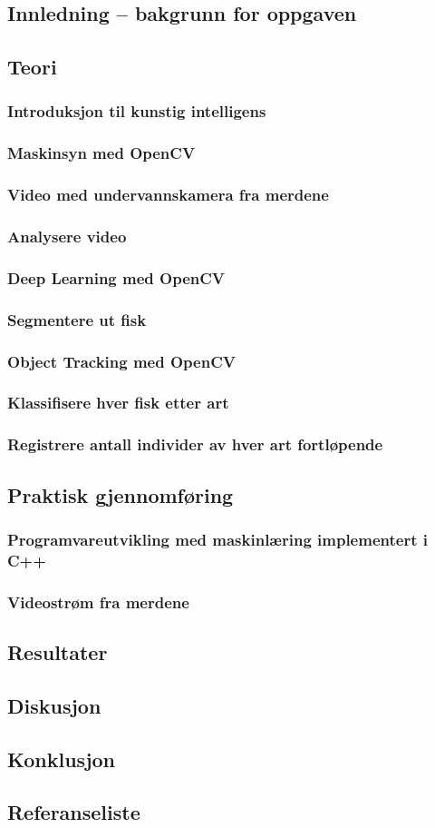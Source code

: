 \subsection{Innledning -- bakgrunn for oppgaven}
\subsection{Teori}
\subsubsection{Introduksjon til kunstig intelligens}
\subsubsection{Maskinsyn med OpenCV}
\subsubsection{Video med undervannskamera fra merdene}
\subsubsection{Analysere video}
\subsubsection{Deep Learning med OpenCV}
\subsubsection{Segmentere ut fisk}
\subsubsection{Object Tracking med OpenCV}
\subsubsection{Klassifisere hver fisk etter art}
\subsubsection{Registrere antall individer av hver art fortløpende}
\subsection{Praktisk gjennomføring}
\subsubsection{Programvareutvikling med maskinlæring implementert i C++}
\subsubsection{Videostrøm fra merdene}
\subsection{Resultater}
\subsection{Diskusjon}
\subsection{Konklusjon}
\subsection{Referanseliste}
